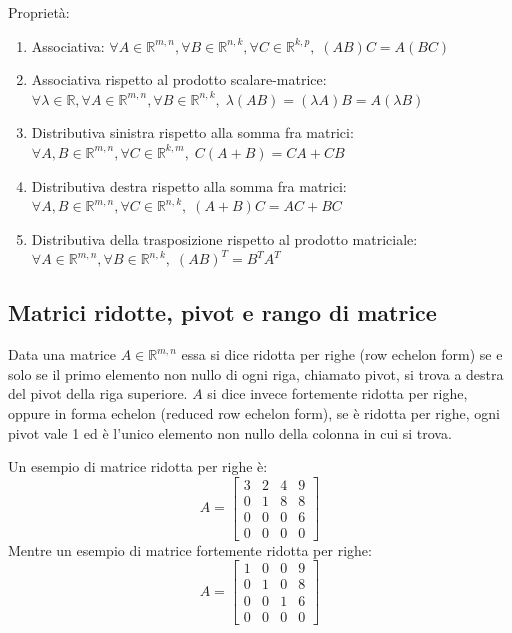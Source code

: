     \vspace{10pt}
    Proprietà:
    \begin{enumerate}[label=(\arabic*)]
        \item Associativa: $\forall A \in \mathbb{R}^{m, n}, \forall B \in \mathbb{R}^{n, k}, \forall C \in \mathbb{R}^{k, p}, \; (AB) C = A (BC)$
        \item Associativa rispetto al prodotto scalare-matrice: $\forall \lambda \in \mathbb{R}, \forall A \in \mathbb{R}^{m, n}, \forall B \in \mathbb{R}^{n, k}, \; \lambda (A  B) = (\lambda A)  B = A  (\lambda B)$
        \item Distributiva sinistra rispetto alla somma fra matrici: $\forall A, B \in \mathbb{R}^{m, n}, \forall C \in \mathbb{R}^{k, m}, \; C (A + B) = C  A + C  B$
        \item Distributiva destra rispetto alla somma fra matrici: $\forall A, B \in \mathbb{R}^{m, n}, \forall C \in \mathbb{R}^{n, k}, \; (A + B) C = AC + BC$
        \item Distributiva della trasposizione rispetto al prodotto matriciale: $\forall A \in \mathbb{R}^{m, n}, \forall B \in \mathbb{R}^{n, k}, \; (A  B)^{T} = B^{T}  A^{T}$
    \end{enumerate}

\subsection{Matrici ridotte, pivot e rango di matrice} \label{subsec:matrank}
    Data una matrice $A \in \mathbb{R}^{m, n}$ essa si dice ridotta per righe (row echelon form) se e solo se il primo elemento non nullo
    di ogni riga, chiamato pivot, si trova a destra del pivot della riga superiore. $A$ si dice invece fortemente ridotta per righe,
    oppure in forma echelon (reduced row echelon form), se è ridotta per righe, ogni pivot vale 1 ed è l'unico elemento non nullo della colonna in cui si trova.

    \vspace{10pt}
    Un esempio di matrice ridotta per righe è:
    \[
        A =
        \begin{bmatrix}
            3 & 2 & 4 & 9 \\
            0 & 1 & 8 & 8 \\
            0 & 0 & 0 & 6 \\
            0 & 0 & 0 & 0
        \end{bmatrix}
    \]
    Mentre un esempio di matrice fortemente ridotta per righe:
    \[
        A =
        \begin{bmatrix}
            1 & 0 & 0 & 9 \\
            0 & 1 & 0 & 8 \\
            0 & 0 & 1 & 6 \\
            0 & 0 & 0 & 0
        \end{bmatrix}
    \]

